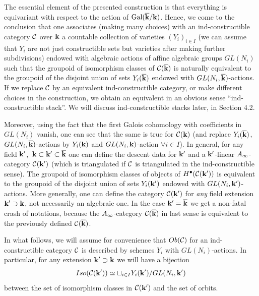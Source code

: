 \documentclass[12pt]{article}
\begin{document}
The essential element of the presented construction is that everything is equivariant with respect to the action of $\operatorname{Gal}({\overline{\bf k}}/{\bf k})$.
Hence, we come to the conclusion that one associates (making many choices) with an ind-constructible category
${\mathcal C}$ over ${\bf k}$ a countable collection of varieties $(Y_i)_{i\in I}$ (we can assume that $Y_i$ are not just constructible sets but varieties
after making further subdivisions) endowed with algebraic actions of affine algebraic groups $GL(N_i)$ such that the groupoid of isomorphism classes
 of ${\mathcal C}({\overline{\bf k}})$ is naturally equivalent to the groupoid of the disjoint union of sets $Y_i({\overline{\bf k}})$ endowed with $GL(N_i,{\overline{\bf k}})$-actions.
If we replace ${\mathcal C}$ by an equivalent ind-constructible category, or make different choices in the construction, we obtain an equivalent in an obvious sense 
``ind-constructible stack''.  We will discuss ind-constructible stacks later, in Section 4.2.



Moreover, using the fact that the first Galois cohomology with coefficients in $GL(N_i)$ vanish, one can see that the same is true for ${\mathcal C}({\bf k})$ (and replace $Y_i({\overline{\bf k}})$, $GL(N_i,{\overline{\bf k}})$-actions by $Y_i({\bf k})$ and $GL(N_i,{\bf k})$-action $\forall i\in I$).
In general, for any field ${\bf k}'$, $\,{\bf k}\subset {\bf k}'\subset {\overline{\bf k}}$ one can define the descent data for ${\bf k}'$ and a ${\bf k}'$-linear $A_{\infty}$-category ${\mathcal C}({\bf k}')$ (which is triangulated 
if ${\mathcal C}$ is triangulated in the ind-constructible sense). The groupoid of isomorphism classes of objects of $H^\bullet({\mathcal C}({\bf k}'))$ is 
equivalent to the groupoid of the disjoint union of sets $Y_i({\bf k}')$ endowed with $GL(N_i,{\bf k}')$-actions.
More generally, one can define the category ${\mathcal C}({\bf k}')$ for {\it any} field extension ${\bf k}'\supset {\bf k}$, not necessarily an algebraic one.
In the case ${\bf k}'={\overline{\bf k}}$ we get a non-fatal crash of notations, because the $A_{\infty}$-category ${\mathcal C}({\overline{\bf k}})$ in last sense is equivalent to the previously
 defined ${\mathcal C}({\overline{\bf k}})$.

In what follows, we will assume for convenience that $Ob({\mathcal C})$ for an ind-constructible category ${\mathcal C}$ is described by schemes $Y_i$ with $GL(N_i)$-actions.
In particular, for any extension ${\bf k}'\supset {\bf k}$ we will have a bijection
 $$Iso({\mathcal C}({\bf k}'))\simeq \sqcup_{i \in I} Y_i({\bf k}')/GL(N_i,{\bf k}')$$
between the set of isomorphism classes in ${\mathcal C}({\bf k}')$ and the set of orbits.
\end{document}

